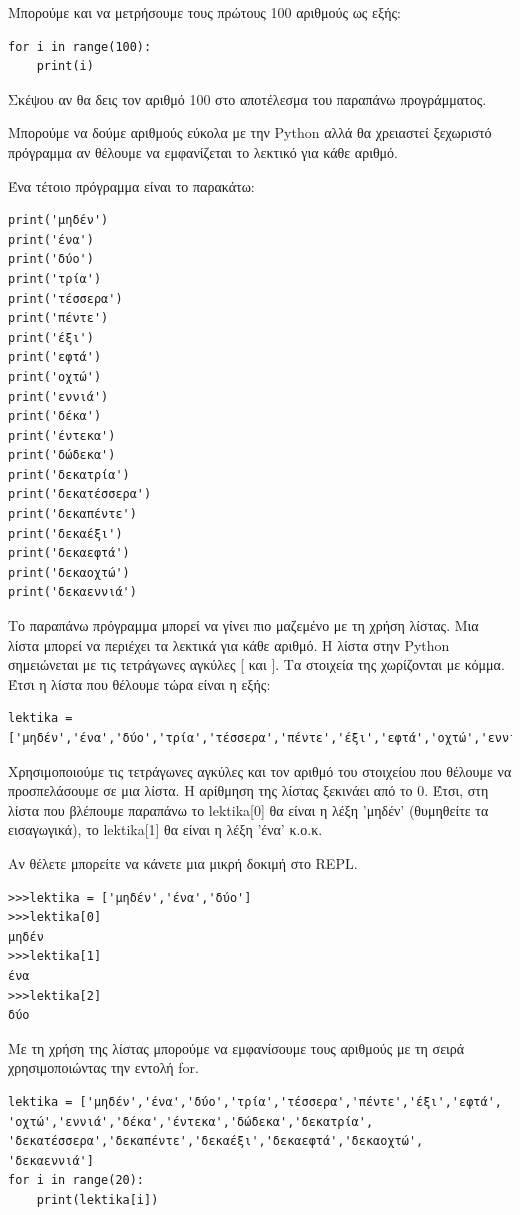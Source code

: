 Mπορούμε και να μετρήσουμε τους πρώτους 100 αριθμούς ως εξής:
\begin{lstlisting}
for i in range(100):
    print(i)
\end{lstlisting}

Σκέψου αν θα δεις τον αριθμό 100 στο αποτέλεσμα του παραπάνω προγράμματος.

Μπορούμε να δούμε αριθμούς εύκολα με την Python αλλά θα χρειαστεί ξεχωριστό πρόγραμμα αν θέλουμε να εμφανίζεται το λεκτικό  για κάθε αριθμό.

Ένα τέτοιο πρόγραμμα είναι το παρακάτω:
\begin{lstlisting}
print('μηδέν')
print('ένα')
print('δύο')
print('τρία')
print('τέσσερα')
print('πέντε')
print('έξι')
print('εφτά')
print('οχτώ')
print('εννιά')
print('δέκα')
print('έντεκα')
print('δώδεκα')
print('δεκατρία')
print('δεκατέσσερα')
print('δεκαπέντε')
print('δεκαέξι')
print('δεκαεφτά')
print('δεκαοχτώ')
print('δεκαεννιά')
\end{lstlisting}

Το παραπάνω πρόγραμμα μπορεί να γίνει πιο μαζεμένο με τη χρήση λίστας. Μια λίστα μπορεί να περιέχει τα λεκτικά για κάθε αριθμό. Η λίστα στην Python σημειώνεται με τις τετράγωνες αγκύλες [ και ]. Τα στοιχεία της χωρίζονται με κόμμα. Έτσι η λίστα που θέλουμε τώρα είναι η εξής:
\begin{lstlisting}
lektika = ['μηδέν','ένα','δύο','τρία','τέσσερα','πέντε','έξι','εφτά','οχτώ','εννιά','δέκα','έντεκα','δώδεκα','δεκατρία','δεκατέσσερα','δεκαπέντε','δεκαέξι','δεκαεφτά','δεκαοχτώ','δεκαεννιά']
\end{lstlisting}
Χρησιμοποιούμε τις τετράγωνες αγκύλες και τον αριθμό του στοιχείου που θέλουμε να προσπελάσουμε σε μια λίστα. Η αρίθμηση της λίστας ξεκινάει από το 0. Έτσι, στη λίστα που βλέπουμε παραπάνω το lektika[0] θα είναι η λέξη 'μηδέν' (θυμηθείτε τα εισαγωγικά), το lektika[1] θα είναι η λέξη 'ένα' κ.ο.κ.

Αν θέλετε μπορείτε να κάνετε μια μικρή δοκιμή στο REPL.
\begin{lstlisting}
>>>lektika = ['μηδέν','ένα','δύο']
>>>lektika[0]
μηδέν
>>>lektika[1]
ένα
>>>lektika[2]
δύο
\end{lstlisting}
Με τη χρήση της λίστας μπορούμε να εμφανίσουμε τους αριθμούς με τη σειρά χρησιμοποιώντας την εντολή for.
\begin{lstlisting}
lektika = ['μηδέν','ένα','δύο','τρία','τέσσερα','πέντε','έξι','εφτά',
'οχτώ','εννιά','δέκα','έντεκα','δώδεκα','δεκατρία',
'δεκατέσσερα','δεκαπέντε','δεκαέξι','δεκαεφτά','δεκαοχτώ',
'δεκαεννιά']
for i in range(20):
    print(lektika[i])
\end{lstlisting}

